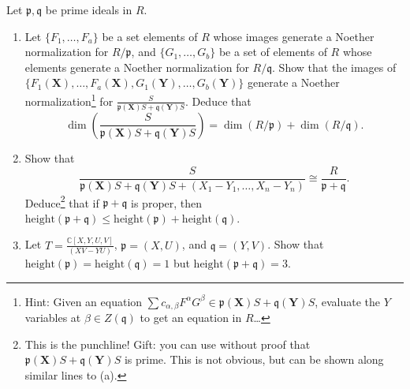 \documentclass[12pt]{amsart}
\newcommand{\C}{\mathbb{C}}
\newcommand{\X}{\mathbf{X}}
\newcommand{\Y}{\mathbf{Y}}
\newcommand{\p}{\mathfrak{p}}
\newcommand{\q}{\mathfrak{q}}
\newcommand{\hgt}{\mathrm{height}}
\newcommand{\ds}{\displaystyle}
\begin{document}
\begin{enumerate}
 Let $\p,\q$ be prime ideals in $R$.
 \begin{enumerate}
\item Let $\{F_1,\dots,F_a\}$ be a set elements of $R$ whose images generate a Noether normalization for $R/\p$, and $\{G_1,\dots,G_b\}$ be a set of elements of $R$ whose elements generate a Noether normalization for $R/\q$. Show that the images of $\{F_1(\X),\dots,F_a(\X),G_1(\Y),\dots,G_b(\Y)\}$ generate a Noether normalization\footnote{Hint: Given an equation $\sum c_{\alpha,\beta} F^\alpha G^\beta \in \p(\X) S + \q(\Y) S$, evaluate the $Y$ variables at $\beta\in Z(\q)$ to get an equation in $R$\dots} for $\ds\frac{S}{\p(\X) S + \q(\Y)S}$. Deduce that 
\[\dim\left(\frac{S}{\p(\X) S + \q(\Y)S}\right) = \dim(R/\p) + \dim(R/\q).\]
\item Show that \[\frac{S}{\p(\X) S + \q(\Y)S + (X_1-Y_1,\dots,X_n-Y_n)}\cong \frac{R}{\p+\q}.\] Deduce\footnote{This is the punchline! {\color{meretale} Gift: you can use without proof that $\p(\X) S + \q(\Y)S$ is prime. This is not obvious, but can be shown along similar lines to (a).}} that if $\p+\q$ is proper, then  $\hgt(\p+\q) \leq \hgt(\p) + \hgt(\q)$.
\item Let $\ds T=\frac{\C[X,Y,U,V]}{(XV-YU)}$, $\p=(X,U)$, and $\q=(Y,V)$. Show that $\hgt(\p)=\hgt(\q)=1$ but $\hgt(\p+\q)=3$.
\end{enumerate}




\end{enumerate}
\end{document}
